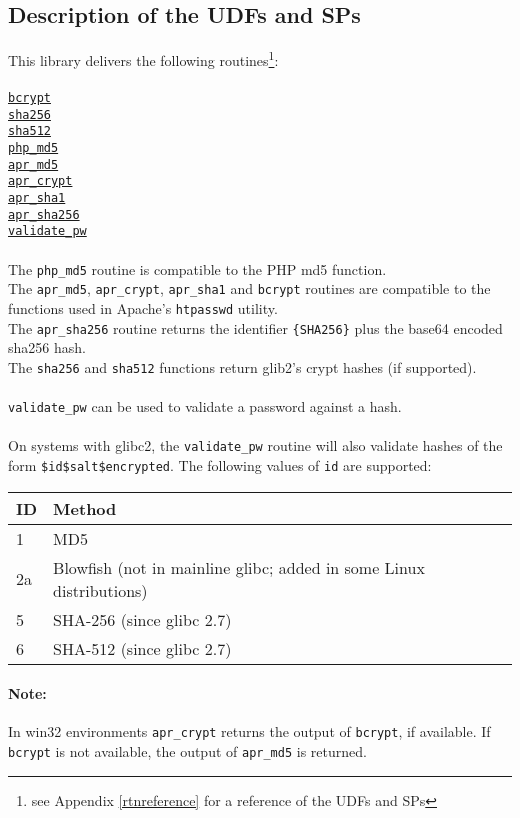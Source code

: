 \subsection{Description of the UDFs and SPs}
This library delivers the following routines\footnote{see Appendix \ref{rtnreference} for a reference of the UDFs and SPs}:\\
\\
\hyperlink{hbcrypt}{\tt bcrypt}\\
\hyperlink{hsha256}{\tt sha256}\\
\hyperlink{hsha512}{\tt sha512}\\
\hyperlink{hphpmd5}{\tt php\_md5}\\
\hyperlink{haprmd5}{\tt apr\_md5}\\
\hyperlink{haprcrypt}{\tt apr\_crypt}\\
\hyperlink{haprsha1}{\tt apr\_sha1}\\
\hyperlink{haprsha256}{\tt apr\_sha256}\\
\hyperlink{hvalidatepw}{\tt validate\_pw}\\
\\
The {\tt php\_md5} routine is compatible to the PHP md5 function.\\
The {\tt apr\_md5}, {\tt apr\_crypt}, {\tt apr\_sha1} and {\tt bcrypt} routines are compatible to the functions used in Apache's {\tt htpasswd} utility.\\
The {\tt apr\_sha256} routine returns the identifier {\tt \{SHA256\}} plus the base64 encoded sha256 hash.\\
The {\tt sha256} and {\tt sha512} functions return glib2's crypt hashes (if supported).\\
\\
{\tt validate\_pw} can be used to validate a password against a hash.\\
\\
On systems with glibc2, the {\tt validate\_pw} routine will also validate hashes of the form \mbox{\tt \$id\$salt\$encrypted}. The following values of {\tt id} are supported:\\

\begin{tabular}{l|l}
 ID  &  Method                                                              \\ \hline
1    &  MD5                                                                 \\
2a   &  Blowfish (not in mainline glibc; added in some Linux distributions) \\
5    &  SHA-256 (since glibc 2.7)                                           \\
6    &  SHA-512 (since glibc 2.7)                                           \\
\end{tabular}

\paragraph{Note:}{In win32 environments {\tt apr\_crypt} returns the output of {\tt bcrypt}, if available. If {\tt bcrypt} is not available, the output of {\tt apr\_md5} is returned.}

